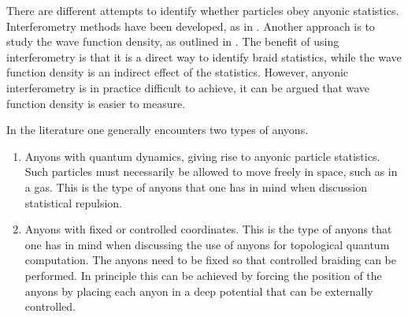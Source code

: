 \documentclass[a4paper,10pt,oneside]{book}
\theoremstyle{plain}
\theoremstyle{definition}
\theoremstyle{remark}
\begin{document}
There are different attempts to identify whether particles obey anyonic statistics. Interferometry methods have been developed, as in \cite{bonderson}. Another approach is to study the wave function density, as outlined in \cite{lundholm-rougerie}. The benefit of using interferometry is that it is a direct way to identify braid statistics, while the wave function density is an indirect effect of the statistics. However, anyonic interferometry is in practice difficult to achieve, it can be argued that wave function density is easier to measure.

In the literature one generally encounters two types of anyons.
\begin{enumerate}
  \item Anyons with quantum dynamics, giving rise to anyonic particle statistics. Such particles must necessarily be allowed to move freely in space, such as in a gas. This is the type of anyons that one has in mind when discussion statistical repulsion.
  \item Anyons with fixed or controlled coordinates. This is the type of anyons that one has in mind when discussing the use of anyons for topological quantum computation. The anyons need to be fixed so that controlled braiding can be performed. In principle this can be achieved by forcing the position of the anyons by placing each anyon in a deep potential that can be externally controlled.
\end{enumerate}












































\end{document}
